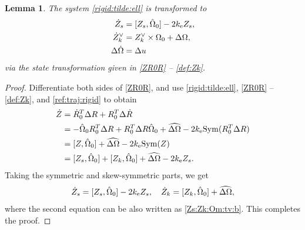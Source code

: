 \documentclass[letterpaper, 10 pt, conference]{ieeeconf}  %
\newtheorem{lemma}[theorem]{Lemma}
\newcommand{\Sym}{\mathrm{Sym}}
\newcommand{\coV}{{k_{\rm e}}}
\begin{document}
\begin{lemma}
The system \eqref{rigid:tilde:ell} is transformed to
\begin{subequations}\label{Zs:Zk:Om:tv}
\begin{align}
\dot Z_s &= [Z_s, \hat \Omega_0] - 2\coV Z_s,\label{Zs:Zk:Om:tv:a}\\
\dot Z_k^\vee &= Z_k^\vee \times \Omega_0 + \Delta \Omega,  \label{Zs:Zk:Om:tv:b}\\
\Delta \dot \Omega &= \Delta u \label{Zs:Zk:Om:tv:c}
\end{align}
\end{subequations}
via the state transformation given in \eqref{ZR0R} -- \eqref{def:Zk}.
\end{lemma}
\begin{proof}
Differentiate both sides of \eqref{ZR0R}, and use \eqref{rigid:tilde:ell},   \eqref{ZR0R} -- \eqref{def:Zk}, and  \eqref{ref:traj:rigid}  to obtain
\begin{align*}
\dot Z &= \dot R_0^T \Delta R + R_0^T\Delta \dot R \\
&= -\hat\Omega_0R_0^T\Delta R + R_0^T \Delta R \hat \Omega_0 + \widehat {\Delta \Omega} - 2\coV \Sym(R_0^T\Delta R)\\
&= [Z, \hat \Omega_0] + \widehat {\Delta \Omega} - 2\coV \Sym(Z)\\
&= [Z_s,  \hat \Omega_0]  + [Z_k,  \hat \Omega_0] + \widehat {\Delta \Omega} - 2\coV Z_s.
\end{align*}
Taking the symmetric and skew-symmetric parts, we get
\begin{align*}
\dot Z_s =  [Z_s,  \hat \Omega_0]  - 2\coV  Z_s,\quad \dot Z_k =   [Z_k,  \hat \Omega_0] + \widehat {\Delta \Omega},
\end{align*}
where the second equation can be also written as \eqref{Zs:Zk:Om:tv:b}.
This completes the proof. 
\end{proof}
\end{document}
